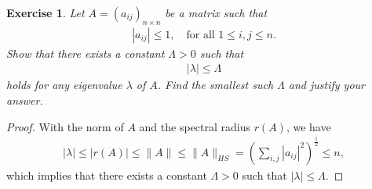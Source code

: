 \documentclass[11pt]{book}
\newtheorem{exercise}{Exercise}[section]
\theoremstyle{definition}
\numberwithin{equation}{chapter}
\begin{document}
\begin{exercise}
Let $A = \left(a_{ij}\right)_{n\times n}$ be a matrix such that
\begin{align*}
    |a_{ij}| \leq 1, \quad \mbox{for all $1\leq i,j \leq n$.}
\end{align*}
Show that there exists a constant $\Lambda > 0$ such that
\begin{align*}
    |\lambda| \leq \Lambda
\end{align*}
holds for any eigenvalue $\lambda$ of $A$. Find the smallest such $\Lambda$ and justify your answer.
\end{exercise}
\begin{proof}
With the norm of $A$ and the spectral radius $r(A)$, we have
\begin{align*}
    |\lambda| \leq |r(A)| \leq \|A\| \leq \|A\|_{HS} = \left(\sum_{i,j}|a_{ij}|^2\right)^{\frac{1}{2}} \leq n,
\end{align*}
which implies that there exists a constant $\Lambda > 0$ such that $|\lambda| \leq \Lambda$.  
\end{proof}















\end{document}
